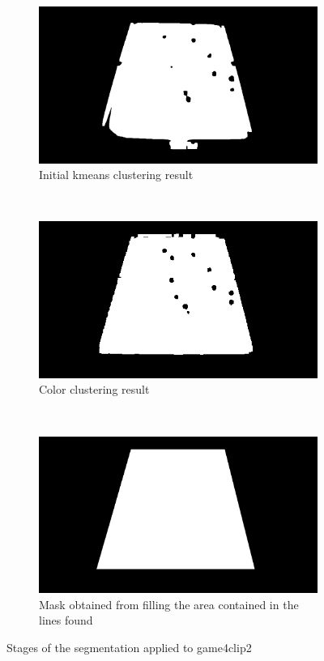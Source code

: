 \begin{figure}
    \centering
    \begin{subfigure}[b]{0.75\textwidth}
        \includegraphics[width=\textwidth]{./imgs/kmeans_cluster.png}
        \caption{Initial kmeans clustering result}
        \label{fig:kmeanstabol}
    \end{subfigure}
    \\
    \begin{subfigure}[b]{0.75\textwidth}
        \includegraphics[width=\textwidth]{./imgs/color_cluster.png}
        \caption{Color clustering result}
        \label{fig:colorsegtabol}
    \end{subfigure}
    \\
    \begin{subfigure}[b]{0.75\textwidth}
        \includegraphics[width=\textwidth]{./imgs/maskfill.png}
        \caption{Mask obtained from filling the area contained in the lines found}
        \label{fig:finalsegtabol}
    \end{subfigure}
    \caption{Stages of the segmentation applied to game4clip2}
    \vspace{30pt}
\end{figure}
